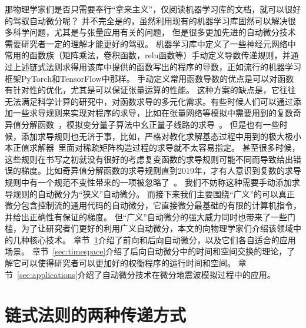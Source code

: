 \documentclass[A4,twoside,fontset=ubuntu,UTF8]{ctexart}
\begin{document}
那物理学家们是否只需要奉行“拿来主义”，仅阅读机器学习库的文档，就可以很好的驾驭自动微分呢？
并不完全是的，虽然利用现有的机器学习库固然可以解决很多科学问题，尤其是与张量应用有关的问题，
但是很多更加先进的自动微分技术需要研究者一定的理解才能更好的驾驭。
机器学习库中定义了一些神经元网络中常用的函数族（矩阵乘法，卷积函数，relu函数等）手动定义导数传递规则，并通过上述链式法则求得用该库中提供的函数写出的程序的导数，正如流行的机器学习框架PyTorch和TensorFlow中那样。
手动定义常用函数导数的优点是可以对函数有针对性的优化，尤其是可以保证张量运算的性能。
这种方案的缺点是，它往往无法满足科学计算的研究中，对函数求导的多元化需求。有些时候人们可以通过添加一些求导规则来实现对程序的求导，比如在张量网络等模拟中需要用到的复数奇异值分解函数~\cite{Wan2019,Liao2019}，模拟变分量子算法中幺正量子线路的求导~\cite{Luo2019}。
但是也有一些时候，添加求导规则也无济于事，比如，严格对教化求解基态过程中用到的极大极小本正值求解器~\cite{Xie2020}里面对稀疏矩阵构造过程的求导就不太容易指定。
甚至很多时候，这些规则在书写之初就没有很好的考虑复变函数的求导规则可能不同而导致给出错误的梯度。比如奇异值分解函数的求导规则直到2019年，才有人意识到复数的求导规则中有一个规范不变性带来的一项被忽略了~\cite{Wan2019}。
我们不妨称这种需要手动添加求导规则的自动微分为“狭义”自动微分。
而接下来我们主要围绕“广义”的可以真正微分包含控制流的通用代码的自动微分，它直接微分最基础的有限的计算机指令，并给出正确性有保证的梯度。
但“广义”自动微分的强大威力同时也带来了一些门槛，为了让研究者们更好的利用广义自动微分，本文的向物理学家们介绍该领域中的几种核心技术。
章节~\ref{sec:forwardbackward}介绍了前向和后向自动微分，以及它们各自适合的应用场景。
章节~\ref{sec:timespace}介绍了后向自动微分中的时间和空间交换的理论，了解它可以使得研究者可以更加好的权衡程序的运行时间和空间。
章节~\ref{sec:applications}介绍了自动微分技术在微分地震波模拟过程中的应用。

\section{链式法则的两种传递方式}\label{sec:forwardbackward}
\end{document}
